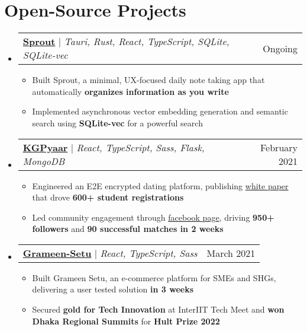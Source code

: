 \documentclass[letterpaper,11pt]{article}
\makeatletter
\newcommand{\resumeItem}[1]{
  \item\small{
    {#1 \vspace{-3pt}} %
  }
}
\newcommand{\resumeProjectHeading}[2]{
    \vspace{1pt}\item %
    \begin{tabular*}{0.97\textwidth}{l@{\extracolsep{\fill}}r}
      \small#1 & \small #2\\
    \end{tabular*}\vspace{-7pt} %
}
\newcommand{\resumeSubHeadingListStart}{\begin{itemize}[leftmargin=0.0in, label={}]} %
\newcommand{\resumeSubHeadingListEnd}{\end{itemize}} %
\newcommand{\resumeItemListStart}{\begin{itemize}} %
\newcommand{\resumeItemListEnd}{\end{itemize}\vspace{-9pt}} %
\makeatother
\begin{document}
\section{Open-Source Projects}
%
\resumeSubHeadingListStart
\resumeProjectHeading
{\textbf{\href{https://github.com/kgpyaar-tech?tab=repositories}{Sprout}} $|$ \emph{Tauri, Rust, React, TypeScript, SQLite, SQLite-vec}}{Ongoing} %
\resumeItemListStart
\resumeItem{Built Sprout, a minimal, UX-focused daily note taking app that automatically \textbf{organizes information as you write}} %
\resumeItem{Implemented asynchronous vector embedding generation and semantic search using \textbf{SQLite-vec} for a powerful search} %
\resumeItemListEnd
\resumeProjectHeading
{\textbf{\href{https://github.com/kgpyaar-tech?tab=repositories}{KGPyaar}} $|$ \emph{React, TypeScript, Sass, Flask, MongoDB}}{February 2021} %
\resumeItemListStart
\resumeItem{Engineered an E2E encrypted dating platform, publishing \href{https://bit.ly/KGPyaar-Doc}{white paper} that drove \textbf{600+ student registrations}} %
\resumeItem{Led community engagement through \href{https://www.facebook.com/KGPyaar}{facebook page}, driving \textbf{950+ followers} and \textbf{90 successful matches in 2 weeks}} %
\resumeItemListEnd
\resumeProjectHeading
{\textbf{\href{https://github.com/InterEyeEyeTea2021/frontend}{Grameen-Setu}} $|$ \emph{React, TypeScript, Sass}}{March 2021} %
\resumeItemListStart
\resumeItem{Built Grameen Setu, an e-commerce platform for SMEs and SHGs, delivering a user tested solution \textbf{in 3 weeks}} %
\resumeItem{Secured \textbf{gold for Tech Innovation} at InterIIT Tech Meet and \textbf{won Dhaka Regional Summits} for \textbf{Hult Prize 2022}} %
\resumeItemListEnd
\resumeSubHeadingListEnd
\vspace{-17pt}
\end{document}
